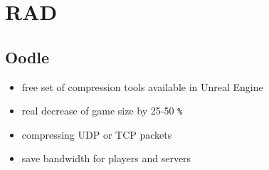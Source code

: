 \chapter{RAD}
    \section{Oodle}
        \begin{itemize}
            \item free set of compression tools available in Unreal Engine
            \item real decrease of game size by 25-50 \colorbox{mygray}{\lstinline{%}}
            \item compressing UDP or TCP packets
            \item save bandwidth for players and servers
        \end{itemize}

        
